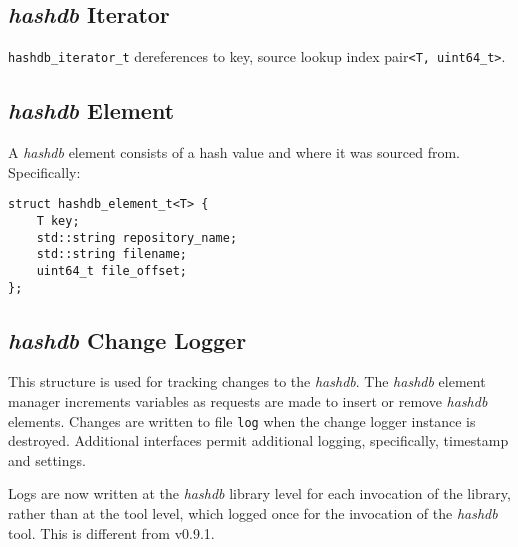 \documentclass[12pt,twoside]{article}
\newcommand{\hdb}{\emph{hashdb}\xspace}
\begin{document}
\subsection{\hdb Iterator}
\texttt{hashdb\_iterator\_t} dereferences to
key, source lookup index pair\texttt{<T, uint64\_t>}.

\subsection{\hdb Element}
A \hdb element consists of a hash value and where it was sourced from.
Specifically:
\begin{small}
\begin{verbatim}
struct hashdb_element_t<T> {
    T key;
    std::string repository_name;
    std::string filename;
    uint64_t file_offset;
};
\end{verbatim}
\end{small}

\subsection{\hdb Change Logger}
This structure is used for tracking changes to the \hdb.
The \hdb element manager increments variables
as requests are made to insert or remove \hdb elements.
Changes are written to file \texttt{log}
when the change logger instance is destroyed.
Additional interfaces permit additional logging,
specifically, timestamp and settings.

Logs are now written at the \hdb library level
for each invocation of the library,
rather than at the tool level, which logged once
for the invocation of the \hdb tool.
This is different from v0.9.1.
\end{document}
